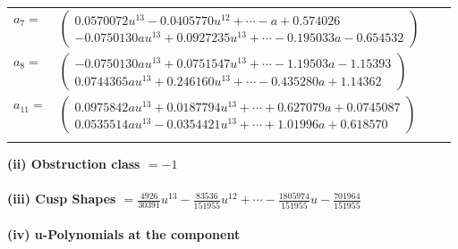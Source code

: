 \documentclass[1p]{elsarticle_modified}
\theoremstyle{definition}
\begin{document}
\begin{tabular}{m{7pt} m{180pt} m{7pt} m{180pt} }
\flushright $a_{7}=$&$\begin{pmatrix}0.0570072 u^{13}-0.0405770 u^{12}+\cdots-a+0.574026\\-0.0750130 a u^{13}+0.0927235 u^{13}+\cdots-0.195033 a-0.654532\end{pmatrix}$ \\
\flushright $a_{8}=$&$\begin{pmatrix}-0.0750130 a u^{13}+0.0751547 u^{13}+\cdots-1.19503 a-1.15393\\0.0744365 a u^{13}+0.246160 u^{13}+\cdots-0.435280 a+1.14362\end{pmatrix}$ \\
\flushright $a_{11}=$&$\begin{pmatrix}0.0975842 a u^{13}+0.0187794 u^{13}+\cdots+0.627079 a+0.0745087\\0.0535514 a u^{13}-0.0354421 u^{13}+\cdots+1.01996 a+0.618570\end{pmatrix}$\\&\end{tabular}
\flushleft \textbf{(ii) Obstruction class $= -1$}\\~\\
\flushleft \textbf{(iii) Cusp Shapes $= \frac{4926}{30391} u^{13}-\frac{83536}{151955} u^{12}+\cdots-\frac{1805974}{151955} u-\frac{701964}{151955}$}\\~\\
\newpage\renewcommand{\arraystretch}{1}
\flushleft \textbf{(iv) u-Polynomials at the component}\newline \\
\end{document}
